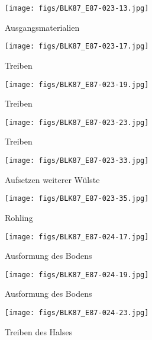 \begin{figure*}[p]
	\centering
	\begin{subfigure}[t]{0.32\textwidth}
		\centering
		\texttt{[image: figs/BLK87\_E87-023-13.jpg]}
		\caption{Ausgangsmaterialien}
		\label{fig:BLK87_Töpferei_1}
	\end{subfigure}
	\begin{subfigure}[t]{0.32\textwidth}
		\centering
		\texttt{[image: figs/BLK87\_E87-023-17.jpg]}
		\caption{Treiben}
		\label{fig:BLK87_Töpferei_2a}
	\end{subfigure}
	\begin{subfigure}[t]{0.32\textwidth}
		\centering
		\texttt{[image: figs/BLK87\_E87-023-19.jpg]}
		\caption{Treiben}
		\label{fig:BLK87_Töpferei_2}
	\end{subfigure}
	\begin{subfigure}[t]{0.32\textwidth}
		\centering
		\texttt{[image: figs/BLK87\_E87-023-23.jpg]}
		\caption{Treiben}
		\label{fig:BLK87_Töpferei_2c}
	\end{subfigure}
	\begin{subfigure}[t]{0.32\textwidth}
		\centering
		\texttt{[image: figs/BLK87\_E87-023-33.jpg]}
		\caption{Aufsetzen weiterer Wülste}
		\label{fig:BLK87_Töpferei_3}
	\end{subfigure}
	\begin{subfigure}[t]{0.32\textwidth}
		\centering
		\texttt{[image: figs/BLK87\_E87-023-35.jpg]}
		\caption{Rohling}
		\label{fig:BLK87_Töpferei_3a}
	\end{subfigure}
	\begin{subfigure}[t]{0.32\textwidth}
		\centering
		\texttt{[image: figs/BLK87\_E87-024-17.jpg]}
		\caption{Ausformung des Bodens}
		\label{fig:BLK87_Töpferei_3b}
	\end{subfigure}
	\begin{subfigure}[t]{0.32\textwidth}
		\centering
		\texttt{[image: figs/BLK87\_E87-024-19.jpg]}
		\caption{Ausformung des Bodens}
		\label{fig:BLK87_Töpferei_3c}
	\end{subfigure}
	\begin{subfigure}[t]{0.32\textwidth}
		\centering
		\texttt{[image: figs/BLK87\_E87-024-23.jpg]}
		\caption{Treiben des Halses}
		\label{fig:BLK87_Töpferei_4}
	\end{subfigure}
	\begin{subfigure}[t]{0.32\textwidth}

\end{subfigure}
\end{figure*}
